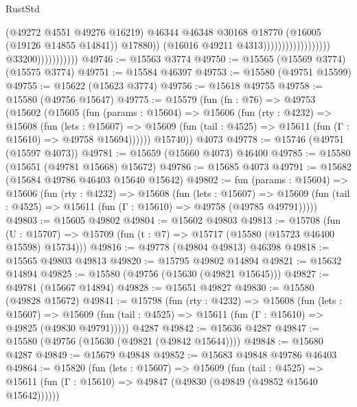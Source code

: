 \begin{lexlean}{RustStd}
\begin{coremodule}
                                                                (@49272 @4551 @49276 @16219)
                                                                @46344
                                                                @46348
                                                                @30168
                                                                @18770
                                                                (@16005 (@19126 @14855 @14841))
                                                                @17880))
                                                            (@16016 @49211 @4313))))))))))))))))))
                          @33200)))))))))))
@49746 := @15563 @3774
@49750 := @15565 (@15569 @3774) (@15575 @3774)
@49751 := @15584 @46397
@49753 := @15580 (@49751 @15599)
@49755 := @15622 (@15623 @3774)
@49756 := @15618 @49755
@49758 := @15580 (@49756 @15647)
@49775 := @15579
    (fun (fn : @76) =>
    @49753
      (@15602
        (@15605
          (fun (params : @15604) =>
          @15606
            (fun (rty : @4232) =>
            @15608
              (fun (lets : @15607) =>
              @15609 (fun (tail : @4525) => @15611 (fun (Γ : @15610) => @49758 @15694))))))
        @15740))
    @4073
@49778 := @15746 (@49751 (@15597 @4073))
@49781 := @15659 (@15660 @4073) @46400
@49785 := @15580 (@15651 (@49781 @15668) @15672)
@49786 := @15685 @4073
@49791 := @15682 (@15684 @49786 @46403 @15640 @15642)
@49802 := fun (params : @15604) =>
  @15606
    (fun (rty : @4232) =>
    @15608
      (fun (lets : @15607) =>
      @15609 (fun (tail : @4525) => @15611 (fun (Γ : @15610) => @49758 (@49785 @49791)))))
@49803 := @15605 @49802
@49804 := @15602 @49803
@49813 := @15708
    (fun (U : @15707) => @15709 (fun (t : @7) => @15717 (@15580 (@15723 @46400 @15598) @15734)))
@49816 := @49778 (@49804 @49813) @46398
@49818 := @15565 @49803 @49813
@49820 := @15795 @49802 @14894
@49821 := @15632 @14894
@49825 := @15580 (@49756 (@15630 (@49821 @15645)))
@49827 := @49781 (@15667 @14894)
@49828 := @15651 @49827
@49830 := @15580 (@49828 @15672)
@49841 := @15798
    (fun (rty : @4232) =>
    @15608
      (fun (lets : @15607) =>
      @15609 (fun (tail : @4525) => @15611 (fun (Γ : @15610) => @49825 (@49830 @49791)))))
    @4287
@49842 := @15636 @4287
@49847 := @15580 (@49756 (@15630 (@49821 (@49842 @15644))))
@49848 := @15680 @4287
@49849 := @15679 @49848
@49852 := @15683 @49848 @49786 @46403
@49864 := @15820
    (fun (lets : @15607) =>
    @15609
      (fun (tail : @4525) =>
      @15611 (fun (Γ : @15610) => @49847 (@49830 (@49849 (@49852 @15640 @15642))))))

\end{coremodule}
\end{lexlean}
